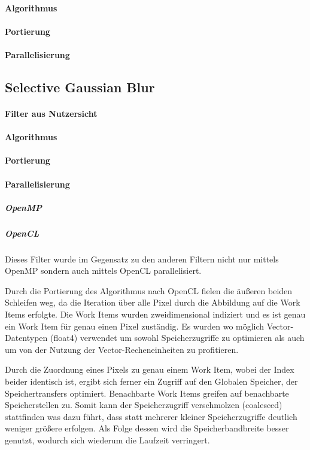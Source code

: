 \documentclass[10pt,a4paper]{article}
\begin{document}
\paragraph{Algorithmus} 
\paragraph{Portierung}
\paragraph{Parallelisierung}





\subsection{Selective Gaussian Blur}
\paragraph{Filter aus Nutzersicht}
\paragraph{Algorithmus} 
\paragraph{Portierung}
\paragraph{Parallelisierung}
\subparagraph{OpenMP}
\subparagraph{OpenCL}
Dieses Filter wurde im Gegensatz zu den anderen Filtern nicht nur mittels OpenMP sondern auch mittels OpenCL parallelisiert. 



Durch die Portierung des Algorithmus nach OpenCL fielen die äußeren beiden Schleifen weg, da die Iteration über alle Pixel durch die Abbildung auf die Work Items erfolgte. Die Work Items wurden zweidimensional indiziert und es ist genau ein Work Item für genau einen Pixel zuständig.
Es wurden wo möglich Vector-Datentypen (float4) verwendet um sowohl Speicherzugriffe zu optimieren als auch um von der Nutzung der Vector-Recheneinheiten zu profitieren.

Durch die Zuordnung eines Pixels zu genau einem Work Item, wobei der Index beider identisch ist, ergibt sich ferner ein Zugriff auf den Globalen Speicher, der Speichertransfers optimiert. Benachbarte Work Items greifen auf benachbarte Speicherstellen zu. Somit kann der Speicherzugriff verschmolzen (coalesced) stattfinden was dazu führt, dass statt mehrerer kleiner Speicherzugriffe deutlich weniger größere erfolgen. Als Folge dessen wird die Speicherbandbreite besser genutzt, wodurch sich wiederum die Laufzeit verringert.
\end{document}
